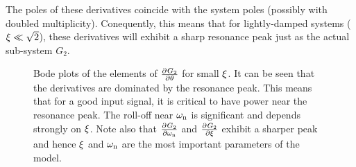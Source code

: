 \begin{subappendices}
The poles of these derivatives coincide with the system poles (possibly with doubled multiplicity).
Conequently, this means that for lightly-damped systems ($\xi \ll \sqrt{2}$), these derivatives will exhibit a sharp resonance peak just as the actual sub-system $G_2$.




\begin{figure}
  \centering
  \setlength{}
  \setlength\figureheight{\figurewidth}
  
  \caption{Bode plots of the elements of $\frac{{\partial}^{} G_2}{\partial \theta}$ for small $\xi$. It can be seen that the derivatives are dominated by the resonance peak. This means that for a good input signal, it is critical to have power near the resonance peak. The roll-off near $\omega_{\mathrm{n}}$ is significant and depends strongly on $\xi$. Note also that $\frac{{\partial}^{} G_2}{\partial \omega_{\mathrm{n}}}$ and $\frac{{\partial}^{} G_2}{\partial \xi}$ exhibit a sharper peak and hence $\xi$ and $\omega_{\mathrm{n}}$ are the most important parameters of the model.
  }
\end{figure}


\end{subappendices}



